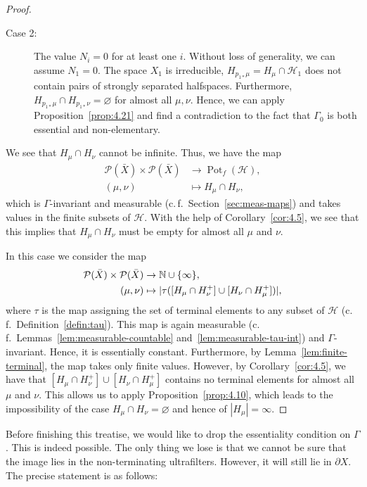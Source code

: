 \begin{proof}
\begin{description}
\begin{description}
    \item[Case 2:] The value \(N_i = 0\) for at least one \(i\). Without loss of generality, we can assume \(N_1 = 0\). The space \(X_1\) is irreducible, \(H_{p_{1\ast}\mu} = H_\mu \cap \mathcal{H}_1\) does not contain pairs of strongly separated halfspaces. Furthermore, \(H_{p_{1\ast}\mu} \cap H_{p_{1\ast}\nu} = \varnothing\) for almost all \(\mu, \nu\). Hence, we can apply Proposition~\ref{prop:4.21} and find a contradiction to the fact that \(\Gamma_0\) is both essential and non-elementary.
    \end{description}
  \end{description}
  We see that \(H_\mu \cap H_\nu\) cannot be infinite. Thus, we have the map
  \begin{align*}
    \mathcal{P}(\bar X) \times \mathcal{P}(\bar X) & \to \operatorname{Pot}_f(\mathcal{H}),\\
    (\mu,\nu) &\mapsto H_\mu \cap H_\nu,
  \end{align*}
  which is \(\Gamma\)-invariant and measurable (c.\,f.~Section~\ref{sec:meas-maps}) and takes values in the finite subsets of \(\mathcal{H}\). With the help of Corollary~\ref{cor:4.5}, we see that this implies that \(H_\mu \cap H_\nu\) must be empty for almost all \(\mu\) and \(\nu\).

  In this case we consider the map
  \begin{align*}
    \mathcal{P}(\bar X) \times \mathcal{P}(\bar X) &\to \mathbb{N} \cup \{\infty\},\\
    (\mu, \nu) &\mapsto |\tau([H_\mu \cap H_\nu^+] \cup [H_\nu \cap H_\mu^+])|,
  \end{align*}
  where \(\tau\) is the map assigning the set of terminal elements to any subset of \(\mathcal{H}\) (c.\,f.~Definition~\ref{defin:tau}). This map is again measurable (c.\,f.\ Lemmas~\ref{lem:measurable-countable} and~\ref{lem:measurable-tau-int}) and \(\Gamma\)-invariant. Hence, it is essentially constant. Furthermore, by Lemma~\ref{lem:finite-terminal}, the map takes only finite values. However, by Corollary~\ref{cor:4.5}, we have that \([H_\mu \cap H_\nu^+] \cup [H_\nu \cap H_\mu^+]\) contains no terminal elements for almost all \(\mu\) and \(\nu\). This allows us to apply Proposition~\ref{prop:4.10}, which leads to the impossibility of the case \(H_\mu \cap H_\nu = \varnothing\) and hence of \(|H_\mu| = \infty\). 
\end{proof}

Before finishing this treatise, we would like to drop the essentiality condition on \(\Gamma\). This is indeed possible. The only thing we lose is that we cannot be sure that the image lies in the non-terminating ultrafilters. However, it will still lie in \(\partial X\). The precise statement is as follows:

